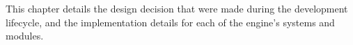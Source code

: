 
This chapter details the design decision that were made during the development lifecycle,
and the implementation details for each of the engine's systems and modules.

